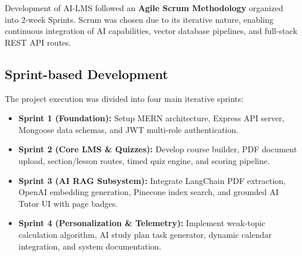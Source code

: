 Development of AI-LMS followed an \textbf{Agile Scrum Methodology} organized into 2-week Sprints. Scrum was chosen due to its iterative nature, enabling continuous integration of AI capabilities, vector database pipelines, and full-stack REST API routes.

\begin{center}
\end{center}

\subsection{Sprint-based Development}

The project execution was divided into four main iterative sprints:
\begin{itemize}
    \item \textbf{Sprint 1 (Foundation):} Setup MERN architecture, Express API server, Mongoose data schemas, and JWT multi-role authentication.
    \item \textbf{Sprint 2 (Core LMS \& Quizzes):} Develop course builder, PDF document upload, section/lesson routes, timed quiz engine, and scoring pipeline.
    \item \textbf{Sprint 3 (AI RAG Subsystem):} Integrate LangChain PDF extraction, OpenAI embedding generation, Pinecone index search, and grounded AI Tutor UI with page badges.
    \item \textbf{Sprint 4 (Personalization & Telemetry):} Implement weak-topic calculation algorithm, AI study plan task generator, dynamic calendar integration, and system documentation.
\end{itemize}

